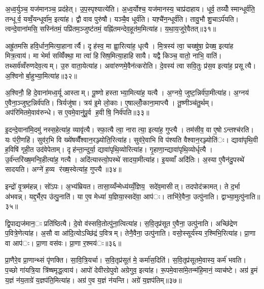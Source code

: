 अ॒ध्व॒र्युञ्च॒ यज॑मानञ्च॒ प्रद॑हेत्। उ॒प॒स्पृश्यात्ये॑ति। अ॒ध्व॒र्योश्च॒ यज॑मानस्य॒ चाप्र॑दाहाय। धूर्व॒ तय्योँस्मान्धूर्व॑ति॒ तन्धूर्व॒ यव्वँ॒यन्धूर्वा॑म॒ इत्या॑ह। द्वौ वाव पुरु॑षौ। यञ्चै॒व धूर्व॑ति। यश़्चै॑न॒न्धूर्व॑ति। तावु॒भौ शु॒चाऽर्प॑यति। त्वन्दे॒वाना॑मसि॒ सस्नि॑तमं॒ पप्रि॑तम॒ञ्जुष्ट॑तमं॒ वह्नि॑तमन्देव॒हूत॑म॒मित्या॑ह। य॒था॒य॒जुरे॒वैतत्॥३१॥

अह्रु॑तमसि हवि॒र्धान॒मित्या॒हानार्त्यै। दृह॑स्व॒ मा ह्वा॒रित्या॑ह॒ धृत्यै। मि॒त्रस्य॑ त्वा॒ चख्षु॑षा॒ प्रेख्ष॒ इत्या॑ह मित्र॒त्वाय॑। मा भेर्मा सव्विँ॑क्था॒ मा त्वा॑ हिसिष॒मित्या॒हाहिसायै। यद्वै किञ्च॒ वातो॒ नाभि॒ वाति॑। तथ्सर्व॑व्वँरुणदेव॒त्यम्। उ॒रु वाता॒येत्या॑ह। अवा॑रुणमे॒वैन॑त्करोति। दे॒वस्य॑ त्वा सवि॒तुः प्र॑स॒व इत्या॑ह॒ प्रसूत्यै। अ॒श्विनोर्बा॒हुभ्या॒मित्या॑ह॥३२॥

अ॒श्विनौ॒ हि दे॒वाना॑मध्व॒र्यू आस्ताम्। पू॒ष्णो हस्ताभ्या॒मित्या॑ह॒ यत्यै। अ॒ग्नये॒ जुष्ट॒न्निर्व॑पा॒मीत्या॑ह। अ॒ग्नय॑ ए॒वैना॒ञ्जुष्ट॒न्निर्व॑पति। त्रिर्यजु॑षा। त्रय॑ इ॒मे लो॒काः। ए॒षाल्लोँ॒काना॒माप्त्यै। तू॒ष्णीञ्च॑तु॒र्थम्। अप॑रिमितमे॒वाव॑रुन्धे। स ए॒वमे॒वानु॑पू॒र्व ह॒वीषि॒ निर्व॑पति॥३३॥

इ॒दन्दे॒वाना॑मि॒दमु॑ नस्स॒हेत्या॑ह॒ व्यावृ॑त्यै। स्फा॒त्यै त्वा॒ नारात्या॒ इत्या॑ह॒ गुप्त्यै। तम॑सीव॒ वा ए॒षोऽन्तश्च॑रति। यः प॑री॒णहि॑। सुव॑र॒भि वि ख्ये॑षव्वैँश्वान॒रञ्ज्योति॒रित्या॑ह। सुव॑रे॒वाभि वि प॑श्यति वैश्वान॒रञ्ज्योति॑ः। द्यावा॑पृथि॒वी ह॒विषि॑ गृही॒त उद॑वेपेताम्। दृह॑न्ता॒न्दुर्या॒ द्यावा॑पृथि॒व्योरित्या॑ह। गृ॒हाणा॒न्द्यावा॑पृथि॒व्योर्धृत्यै। उ॒र्व॑न्तरि॑ख्ष॒मन्वि॒हीत्या॑ह॒ गत्यै। अदि॑त्यास्त्वो॒पस्थे॑ सादया॒मीत्या॑ह। इ॒यव्वाँ अदि॑तिः। अ॒स्या ए॒वैन॑दु॒पस्थे॑ सादयति। अग्ने॑ ह॒व्य र॑ख्ष॒स्वेत्या॑ह॒ गुप्त्यै॥३४॥


इन्द्रो॑ वृ॒त्रम॑हन्न्। सो॑ऽपः। अ॒भ्य॑म्रियत। तासा॒य्यँन्मेध्य॑य्यँ॒ज्ञिय॒ सदे॑व॒मासीत्। तदपोद॑क्रामत्। ते द॒र्भा अ॑भवन्न्। यद्द॒र्भैर॒प उ॑त्पु॒नाति॑। या ए॒व मेध्या॑ य॒ज्ञिया॒स्सदे॑वा॒ आप॑ः। ताभि॑रे॒वैना॒ उत्पु॑नाति। द्वाभ्या॒मुत्पु॑नाति॥३५॥

द्वि॒पाद्यज॑मान॒ः प्रति॑ष्ठित्यै। दे॒वो व॑स्सवि॒तोत्पु॑ना॒त्वित्या॑ह। स॒वि॒तृप्र॑सूत ए॒वैना॒ उत्पु॑नाति। अच्छि॑द्रेण प॒वित्रे॒णेत्या॑ह। अ॒सौ वा आ॑दि॒त्योऽच्छि॑द्रं प॒वित्रम्। तेनै॒वैना॒ उत्पु॑नाति। वसो॒स्सूर्य॑स्य र॒श्मिभि॒रित्या॑ह। प्रा॒णा वा आप॑ः। प्रा॒णा वस॑वः। प्रा॒णा र॒श्मय॑ः॥३६॥

प्रा॒णैरे॒व प्रा॒णान्थ्सं पृ॑णक्ति। सा॒वि॒त्रि॒यर्चा। स॒वि॒तृप्र॑सूतं मे॒ कर्मा॑स॒दिति॑। स॒वि॒तृप्र॑सूतमे॒वास्य॒ कर्म॑ भवति। प॒च्छो गा॑यत्रि॒या त्रि॑ष्षमृद्ध॒त्वाय॑। आपो॑ देवीरग्रेपुवो अग्रेगुव॒ इत्या॑ह। रू॒पमे॒वासा॑मे॒तन्म॑हि॒मानं॒ व्याच॑ष्टे। अग्र॑ इ॒मं य॒ज्ञं न॑य॒ताग्रे॑ य॒ज्ञप॑ति॒मित्या॑ह। अग्र॑ ए॒व य॒ज्ञं न॑यन्ति। अग्रे॑ य॒ज्ञप॑तिम्॥३७॥

